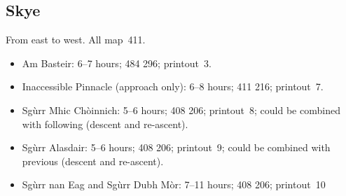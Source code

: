 \documentclass[12pt,a4paper]{article}
\begin{document}






\subsection*{Skye}

From east to west.  All map~411.
%
\begin{itemize}


\item Am Basteir: 6--7 hours; 484 296; printout~3.%




\item Inaccessible Pinnacle (approach only): 6--8 hours; 411 216;
  printout~7. 

\item Sgùrr Mhic Chòinnich: 5--6 hours; 408 206; printout~8; could be
  combined with following (descent and re-ascent).

\item Sgùrr Alasdair: 5--6 hours; 408 206; printout~9; could be combined
  with previous (descent and re-ascent).

\item Sgùrr nan Eag and Sgùrr Dubh Mòr: 7--11 hours;  408 206; printout~10
\end{itemize}
\end{document}
